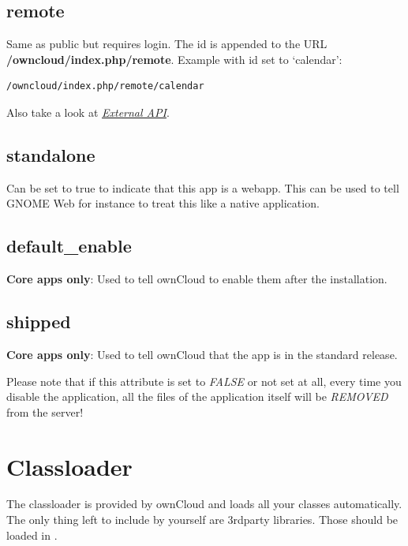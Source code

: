 \documentclass[letterpaper,10pt,english]{sphinxmanual}
\begin{document}
\subsection{remote}
\label{app/info:remote}
Same as public but requires login. The id is appended to the URL \textbf{/owncloud/index.php/remote}. Example with id set to `calendar':

\begin{Verbatim}[commandchars=\\\{\}]
/owncloud/index.php/remote/calendar
\end{Verbatim}

Also take a look at {\hyperref[core/externalapi::doc]{\emph{\emph{External API}}}}.


\subsection{standalone}
\label{app/info:standalone}
Can be set to true to indicate that this app is a webapp. This can be used to tell GNOME Web for instance to treat this like a native application.


\subsection{default\_enable}
\label{app/info:default-enable}
\textbf{Core apps only}: Used to tell ownCloud to enable them after the installation.


\subsection{shipped}
\label{app/info:shipped}
\textbf{Core apps only}: Used to tell ownCloud that the app is in the standard release.

Please note that if this attribute is set to \emph{FALSE} or not set at all, every time you disable the application, all the files of the application itself will be \emph{REMOVED} from the server!


\section{Classloader}
\label{app/classloader:classloader}\label{app/classloader::doc}
The classloader is provided by ownCloud and loads all your classes automatically. The only thing left to include by yourself are 3rdparty libraries. Those should be loaded in .

\end{document}
